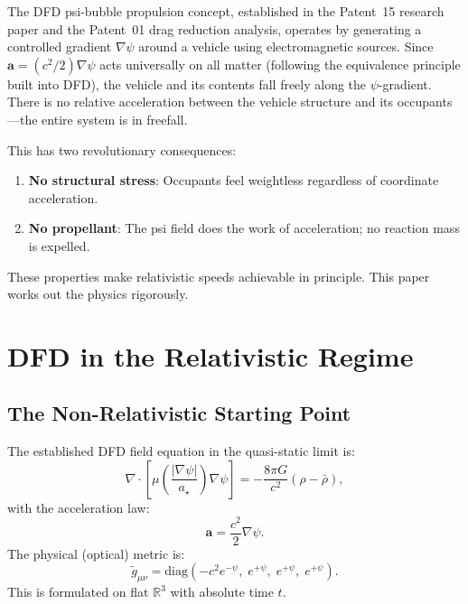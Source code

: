 \documentclass[aps,prd,twocolumn,superscriptaddress,nofootinbib]{revtex4-2}
\newcommand{\avec}{\bm{a}}
\begin{document}
The DFD psi-bubble propulsion concept, established in the Patent~15
research paper and the Patent~01 drag reduction analysis, operates by
generating a controlled gradient $\nabla\psi$ around a vehicle using
electromagnetic sources.  Since $\avec = (c^2/2)\nabla\psi$ acts
universally on all matter (following the equivalence principle built
into DFD), the vehicle and its contents fall freely along the
$\psi$-gradient.  There is no relative acceleration between the
vehicle structure and its occupants---the entire system is in
freefall.

This has two revolutionary consequences:
\begin{enumerate}
\item \textbf{No structural stress}: Occupants feel weightless
regardless of coordinate acceleration.
\item \textbf{No propellant}: The psi field does the work of
acceleration; no reaction mass is expelled.
\end{enumerate}

These properties make relativistic speeds achievable in principle.
This paper works out the physics rigorously.

\section{DFD in the Relativistic Regime}\label{sec:relativistic-dfd}

\subsection{The Non-Relativistic Starting Point}

The established DFD field equation in the quasi-static limit is:
\begin{equation}\label{eq:static-field}
\nabla\cdot\!\left[\mu\!\left(\frac{|\nabla\psi|}{a_\star}\right)
\nabla\psi\right] = -\frac{8\pi G}{c^2}(\rho - \bar{\rho}),
\end{equation}
with the acceleration law:
\begin{equation}\label{eq:accel-law}
\avec = \frac{c^2}{2}\nabla\psi.
\end{equation}
The physical (optical) metric is:
\begin{equation}\label{eq:optical-metric}
\tilde{g}_{\mu\nu} = \mathrm{diag}(-c^2 e^{-\psi},\;
e^{+\psi},\;e^{+\psi},\;e^{+\psi}).
\end{equation}
This is formulated on flat $\mathbb{R}^3$ with absolute time $t$.
\end{document}
